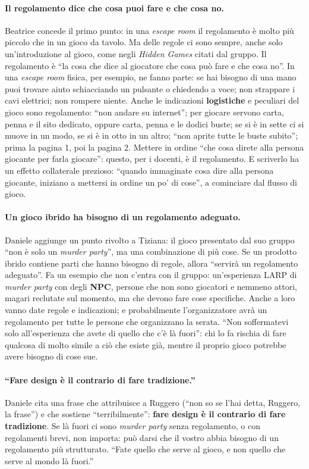 \paragraph{Il regolamento dice che cosa puoi fare e che cosa no.} Beatrice concede il
primo punto: in una \emph{escape room} il regolamento è molto più piccolo che in un
gioco da tavolo. Ma delle regole ci sono sempre, anche solo un'introduzione al gioco,
come negli \emph{Hidden Games} citati dal gruppo. Il regolamento è ``la cosa che dice al
giocatore che cosa può fare e che cosa no''. In una \emph{escape room} fisica, per
esempio, ne fanno parte: se hai bisogno di una mano puoi trovare aiuto schiacciando un
pulsante o chiedendo a voce; non strappare i cavi elettrici; non rompere niente. Anche le
indicazioni \textbf{logistiche} e peculiari del gioco sono regolamento: ``non andare su
internet''; per giocare servono carta, penna e il sito dedicato, oppure carta, penna e
le dodici buste; se si è in sette ci si muove in un modo, se si è in otto in un altro;
``non aprite tutte le buste subito''; prima la pagina 1, poi la pagina 2. Mettere in
ordine ``che cosa direte alla persona giocante per farla giocare'': questo, per i
docenti, è il regolamento. E scriverlo ha un effetto collaterale prezioso: ``quando
immaginate cosa dire alla persona giocante, iniziano a mettersi in ordine un po' di
cose'', a cominciare dal flusso di gioco.

\paragraph{Un gioco ibrido ha bisogno di un regolamento adeguato.} Daniele aggiunge un
punto rivolto a Tiziana: il gioco presentato dal suo gruppo ``non è solo un \emph{murder
party}'', ma una combinazione di più cose. Se un prodotto ibrido contiene parti che
hanno bisogno di regole, allora ``servirà un regolamento adeguato''. Fa un esempio che
non c'entra con il gruppo: un'esperienza LARP di \emph{murder party} con degli
\textbf{NPC}, persone che non sono giocatori e nemmeno attori, magari reclutate sul
momento, ma che devono fare cose specifiche. Anche a loro vanno date regole e
indicazioni; e probabilmente l'organizzatore avrà un regolamento per tutte le persone
che organizzano la serata. ``Non soffermatevi solo all'esperienza che avete di quello che
c'è là fuori'': chi lo fa rischia di fare qualcosa di molto simile a ciò che esiste già,
mentre il proprio gioco potrebbe avere bisogno di cose sue.

\paragraph{``Fare design è il contrario di fare tradizione.''} Daniele cita una frase che
attribuisce a Ruggero (``non so se l'hai detta, Ruggero, la frase'') e che sostiene
``terribilmente'': \textbf{fare design è il contrario di fare tradizione}. Se là fuori ci
sono \emph{murder party} senza regolamento, o con regolamenti brevi, non importa: può
darsi che il vostro abbia bisogno di un regolamento più strutturato. ``Fate quello che
serve al gioco, e non quello che serve al mondo là fuori.''

